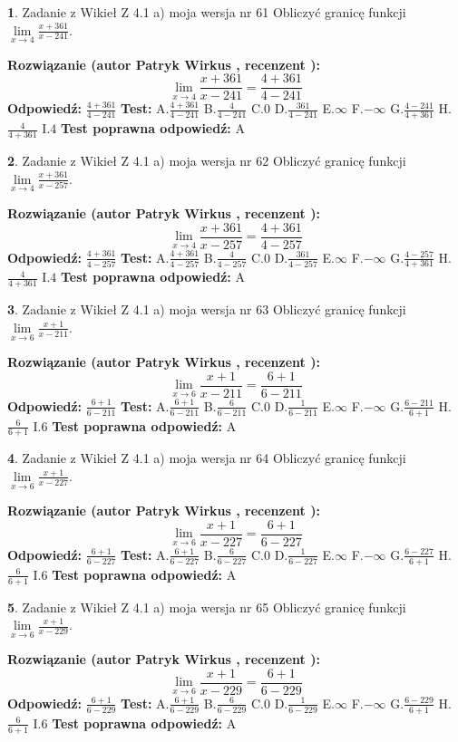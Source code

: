 \documentclass[12pt, a4paper]{article}
\theoremstyle{definition} %
\newtheorem{zad}{}
\newcommand{\zadStart}[1]{\begin{zad}#1\newline}
\newcommand{\zadStop}{\end{zad}}
\newcommand{\rozwStart}[2]{\noindent \textbf{Rozwiązanie (autor #1 , recenzent #2): }\newline}
\newcommand{\rozwStop}{\newline}
\newcommand{\odpStart}{\noindent \textbf{Odpowiedź:}\newline}
\newcommand{\odpStop}{\newline}
\newcommand{\testStart}{\noindent \textbf{Test:}\newline}
\newcommand{\testStop}{\newline}
\newcommand{\kluczStart}{\noindent \textbf{Test poprawna odpowiedź:}\newline}
\newcommand{\kluczStop}{\newline}
\begin{document}
\zadStart{Zadanie z Wikieł Z 4.1 a) moja wersja nr 61}
Obliczyć granicę funkcji $\lim\limits_{x\to4}\frac{x+361}{x-241}$.
\zadStop
\rozwStart{Patryk Wirkus}{}
$$\lim\limits_{x\to4}\frac{x+361}{x-241} = \frac{4+361}{4-241}$$
\rozwStop
\odpStart
$\frac{4+361}{4-241}$
\odpStop
\testStart
A.$\frac{4+361}{4-241}$
B.$\frac{4}{4-241}$
C.$0$
D.$\frac{361}{4-241}$
E.$\infty$
F.$-\infty$
G.$\frac{4-241}{4+361}$
H.$\frac{4}{4+361}$
I.$4$
\testStop
\kluczStart
A
\kluczStop



\zadStart{Zadanie z Wikieł Z 4.1 a) moja wersja nr 62}
Obliczyć granicę funkcji $\lim\limits_{x\to4}\frac{x+361}{x-257}$.
\zadStop
\rozwStart{Patryk Wirkus}{}
$$\lim\limits_{x\to4}\frac{x+361}{x-257} = \frac{4+361}{4-257}$$
\rozwStop
\odpStart
$\frac{4+361}{4-257}$
\odpStop
\testStart
A.$\frac{4+361}{4-257}$
B.$\frac{4}{4-257}$
C.$0$
D.$\frac{361}{4-257}$
E.$\infty$
F.$-\infty$
G.$\frac{4-257}{4+361}$
H.$\frac{4}{4+361}$
I.$4$
\testStop
\kluczStart
A
\kluczStop



\zadStart{Zadanie z Wikieł Z 4.1 a) moja wersja nr 63}
Obliczyć granicę funkcji $\lim\limits_{x\to6}\frac{x+1}{x-211}$.
\zadStop
\rozwStart{Patryk Wirkus}{}
$$\lim\limits_{x\to6}\frac{x+1}{x-211} = \frac{6+1}{6-211}$$
\rozwStop
\odpStart
$\frac{6+1}{6-211}$
\odpStop
\testStart
A.$\frac{6+1}{6-211}$
B.$\frac{6}{6-211}$
C.$0$
D.$\frac{1}{6-211}$
E.$\infty$
F.$-\infty$
G.$\frac{6-211}{6+1}$
H.$\frac{6}{6+1}$
I.$6$
\testStop
\kluczStart
A
\kluczStop



\zadStart{Zadanie z Wikieł Z 4.1 a) moja wersja nr 64}
Obliczyć granicę funkcji $\lim\limits_{x\to6}\frac{x+1}{x-227}$.
\zadStop
\rozwStart{Patryk Wirkus}{}
$$\lim\limits_{x\to6}\frac{x+1}{x-227} = \frac{6+1}{6-227}$$
\rozwStop
\odpStart
$\frac{6+1}{6-227}$
\odpStop
\testStart
A.$\frac{6+1}{6-227}$
B.$\frac{6}{6-227}$
C.$0$
D.$\frac{1}{6-227}$
E.$\infty$
F.$-\infty$
G.$\frac{6-227}{6+1}$
H.$\frac{6}{6+1}$
I.$6$
\testStop
\kluczStart
A
\kluczStop



\zadStart{Zadanie z Wikieł Z 4.1 a) moja wersja nr 65}
Obliczyć granicę funkcji $\lim\limits_{x\to6}\frac{x+1}{x-229}$.
\zadStop
\rozwStart{Patryk Wirkus}{}
$$\lim\limits_{x\to6}\frac{x+1}{x-229} = \frac{6+1}{6-229}$$
\rozwStop
\odpStart
$\frac{6+1}{6-229}$
\odpStop
\testStart
A.$\frac{6+1}{6-229}$
B.$\frac{6}{6-229}$
C.$0$
D.$\frac{1}{6-229}$
E.$\infty$
F.$-\infty$
G.$\frac{6-229}{6+1}$
H.$\frac{6}{6+1}$
I.$6$
\testStop
\kluczStart
A
\kluczStop
\end{document}
